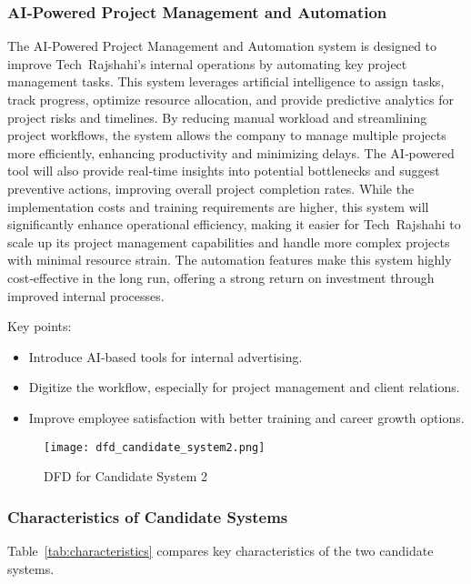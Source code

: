 \documentclass[12pt,a4paper]{article}
\begin{document}
\subsubsection*{AI‑Powered Project Management and Automation}
The AI‑Powered Project Management and Automation system is designed to improve Tech Rajshahi’s internal operations by automating key project management tasks.  This system leverages artificial intelligence to assign tasks, track progress, optimize resource allocation, and provide predictive analytics for project risks and timelines.  By reducing manual workload and streamlining project workflows, the system allows the company to manage multiple projects more efficiently, enhancing productivity and minimizing delays.  The AI‑powered tool will also provide real‑time insights into potential bottlenecks and suggest preventive actions, improving overall project completion rates.  While the implementation costs and training requirements are higher, this system will significantly enhance operational efficiency, making it easier for Tech Rajshahi to scale up its project management capabilities and handle more complex projects with minimal resource strain.  The automation features make this system highly cost‑effective in the long run, offering a strong return on investment through improved internal processes.

Key points:
\begin{itemize}
    \item Introduce AI‑based tools for internal advertising.
    \item Digitize the workflow, especially for project management and client relations.
    \item Improve employee satisfaction with better training and career growth options.
\end{itemize}

\begin{figure}[H]
    \centering
    \texttt{[image: dfd\_candidate\_system2.png]}
      \caption{DFD for Candidate System 2}
    \label{fig:dfd_candidate_system1}
\end{figure}

\subsubsection{Characteristics of Candidate Systems}
Table~\ref{tab:characteristics} compares key characteristics of the two candidate systems.
\end{document}

